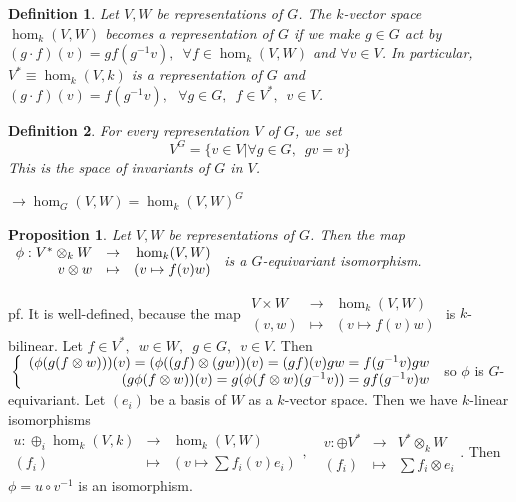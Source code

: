 \documentclass[12pt,letterpaper]{report}
\newtheorem{definition}{Definition}[section]
\newtheorem{proposition}{Proposition}[section]
\begin{document}
\begin{definition}Let $V,W$ be representations of $G$. The $k$-vector space $\hom_{k}(V,W)$ becomes a representation of $G$ if we make $g\in G$ act by $(g\cdot f)(v)=gf(g^{-1}v),\,\,\,\forall f\in\hom_{k}(V,W)$ and $\forall v\in V$. In particular, $V^{*}\equiv\hom_{k}(V,k)$ is a representation of $G$ and $(g\cdot f)(v)=f(g^{-1}v),\,\,\,\,\forall g\in G,\,\,\,f\in V^{*},\,\,\,v\in V$.\end{definition}
\begin{definition}For every representation $V$ of $G$, we set \begin{equation*}V^{G}=\{v\in V|\forall g\in G,\,\,\,gv=v\}\end{equation*} This is the space of invariants of $G$ in $V$.\end{definition}
$\rightarrow \hom_{G}(V,W)=\hom_{k}(V,W)^{G}$
\begin{proposition}Let $V,W$ be representations of $G$. Then the map $\\\begin{array}{rrr}\phi:V^{*}\otimes_{k}W&\rightarrow&\hom_{k}(V,W)\\v\otimes w&\mapsto&(v\mapsto f(v)w)\end{array}$ is a $G$-equivariant isomorphism.\end{proposition}
pf. It is well-defined, because the map $\begin{array}{rrr}V\times W&\rightarrow&\hom_{k}(V,W)\\(v,w)&\mapsto&(v\mapsto f(v)w)\end{array}$ is $k$-bilinear. Let $f\in V^{*},\,\,\,w\in W,\,\,\,g\in G,\,\,\,v\in V$. Then $\\\left\{\begin{array}{r}(\phi(g(f\otimes w)))(v)=(\phi((gf)\otimes(gw))(v)=(gf)(v)gw=f(g^{-1}v)gw\\(g\phi(f\otimes w))(v)=g(\phi(f\otimes w)(g^{-1}v))=gf(g^{-1}v)w\end{array}\right.$ so $\phi$ is $G$-equivariant. Let $(e_{i})$ be a basis of $W$ as a $k$-vector space. Then we have $k$-linear isomorphisms $\begin{array}{rrr}u:\oplus_{i}\hom_{k}(V,k)&\rightarrow&\hom_{k}(V,W)\\(f_{i})&\mapsto&(v\mapsto\sum f_{i}(v)e_{i})\end{array},\,\,\,\,\begin{array}{rrr}v:\oplus V^{*}&\rightarrow&V^{*}\otimes_{k}W\\(f_{i})&\mapsto&\sum f_{i}\otimes e_{i}\end{array}$. Then $\phi=u\circ v^{-1}$ is an isomorphism. 
\end{document}
